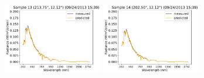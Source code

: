 \begin{center}
\includegraphics[width=0.325\textwidth]{img/09241539_s13.pdf}
\includegraphics[width=0.325\textwidth]{img/09241539_s14.pdf}
\end{center}

\mbox{}
\clearpage

